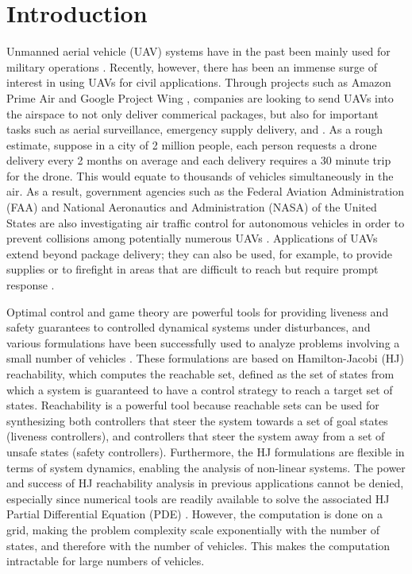 \section{Introduction}
Unmanned aerial vehicle (UAV) systems have in the past been mainly used for military operations \cite{Tice91}. Recently, however, there has been an immense surge of interest in using UAVs for civil applications. Through projects such as Amazon Prime Air \cite{PrimeAir} and Google Project Wing \cite{ProjectWing}, companies are looking to send UAVs into the airspace to not only deliver commerical packages, but also for important tasks such as aerial surveillance, emergency supply delivery, and . As a rough estimate, suppose in a city of 2 million people, each person requests a drone delivery every 2 months on average and each delivery requires a 30 minute trip for the drone. This would equate to thousands of vehicles simultaneously in the air. As a result, government agencies such as the Federal Aviation Administration (FAA) and National Aeronautics and Administration (NASA) of the United States are also investigating air traffic control for autonomous vehicles in order to prevent collisions among potentially numerous UAVs \cite{FAA13}. Applications of UAVs extend beyond package delivery; they can also be used, for example, to provide supplies or to firefight in areas that are difficult to reach but require prompt response \cite{Debusk10}.

Optimal control and game theory are powerful tools for providing liveness and safety guarantees to controlled dynamical systems under disturbances, and various formulations \cite{Bokanowski10,Mitchell05,Barron89} have been successfully used to analyze problems involving a small number of vehicles \cite{Fisac15,Chen14,Ding08}. These formulations are based on Hamilton-Jacobi (HJ) reachability, which computes the reachable set, defined as the set of states from which a system is guaranteed to have a control strategy to reach a target set of states. Reachability is a powerful tool because reachable sets can be used for synthesizing both controllers that steer the system towards a set of goal states (liveness controllers), and controllers that steer the system away from a set of unsafe states (safety controllers). Furthermore, the HJ formulations are flexible in terms of system dynamics, enabling the analysis of non-linear systems. The power and success of HJ reachability analysis in previous applications cannot be denied, especially since numerical tools are readily available to solve the associated HJ Partial Differential Equation (PDE) \cite{LSToolbox,Osher02,Sethian96}. However, the computation is done on a grid, making the problem complexity scale exponentially with the number of states, and therefore with the number of vehicles. This makes the computation intractable for large numbers of vehicles. 

